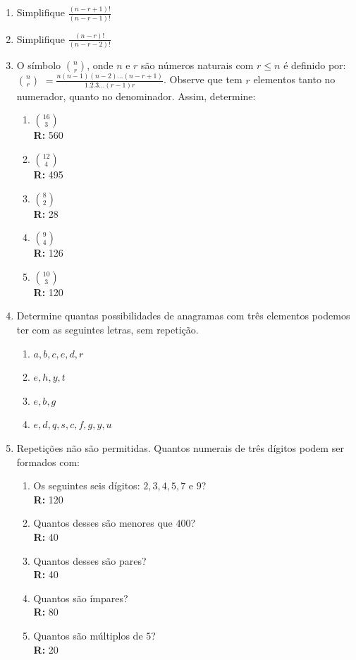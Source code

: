\documentclass[oneside,a4paper,12pt]{article}
\begin{document}
\begin{enumerate}
	\item Simplifique $\frac{(n-r+1)!}{(n-r-1)!}$
	
	\item Simplifique $\frac{(n-r)!}{(n-r-2)!}$
	
	\item O símbolo ${n} \choose{r}$, onde $n$ e $r$ são números naturais com $r \leq n$ é definido por:
	${n} \choose{r}$ $= \frac{n(n-1)(n-2)\dots (n-r+1)}{1.2.3\dots (r-1)r}$. Observe que tem $r$ elementos tanto no numerador, quanto no denominador. Assim, determine: 
	\begin{enumerate}
		\item ${16} \choose{3}$ \\ {\bf R:}  560
		\item ${12} \choose{4}$ \\ {\bf R:}  495
		\item ${8} \choose{2}$ \\ {\bf R:}  28
		\item ${9} \choose{4}$ \\ {\bf R:}  126
		\item ${10} \choose{3}$ \\ {\bf R:}  120
	\end{enumerate}

	\item Determine quantas possibilidades de anagramas com três elementos podemos ter com as seguintes letras, sem repetição.
	\begin{enumerate}
		\item $a,b,c,e,d,r$
		\item $e,h,y,t$
		\item $e,b,g$
		\item $e,d,q,s,c,f,g,y,u$
	\end{enumerate}

	\item Repetições não são permitidas. Quantos numerais de três dígitos podem ser formados com:
	\begin{enumerate}
		\item Os seguintes seis dígitos: $2,3,4,5,7$ e $9$? \\ {\bf R:}  120
		\item Quantos desses são menores que $400$? \\ {\bf R:}  40
		\item Quantos desses são pares? \\ {\bf R:}  40
		\item Quantos são ímpares? \\ {\bf R:}  80
		\item Quantos são múltiplos de $5$? \\ {\bf R:}  20
	\end{enumerate}


\end{enumerate}
\end{document}
